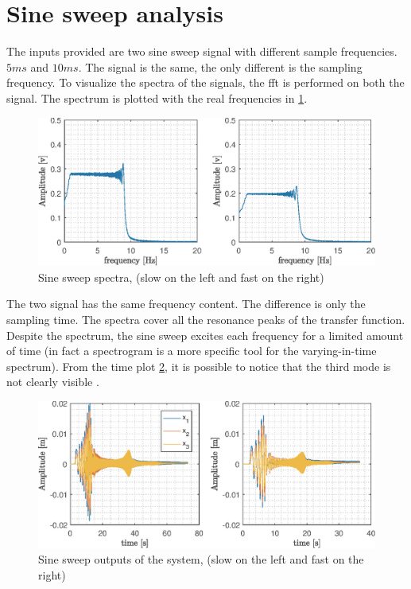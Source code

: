 \documentclass[twosided,a4paper]{article}           %
\begin{document}
\section{Sine sweep analysis}
The inputs provided are two sine sweep signal with different sample frequencies. $5 ms$ and $10 ms$. The signal is the same, the only different is the sampling frequency.
To visualize the spectra of the signals, the fft is performed on both the signal. The spectrum is plotted with the real frequencies in \ref{fig:sinesweepspectra}.
\begin{figure}[H]
	\centering
	\includegraphics[width=\linewidth]{img/sine_sweep_spectra}
	\caption{Sine sweep spectra, (slow on the left and fast on the right)}
	\label{fig:sinesweepspectra}
\end{figure}
\noindent The two signal has the same frequency content. The difference is only the sampling time. The spectra cover all the resonance peaks of the transfer function. Despite the spectrum, the sine sweep excites each frequency for a limited amount of time (in fact a spectrogram is a more specific tool for the varying-in-time spectrum). From the time plot \ref{fig:sinesweeptime}, it is possible to notice that the third mode is not clearly visible .
\begin{figure}[H]
	\centering
	\includegraphics[width=\linewidth]{img/sine_sweep_time}
	\caption{Sine sweep outputs of the system, (slow on the left and fast on the right)}
	\label{fig:sinesweeptime}
\end{figure}
\end{document}
